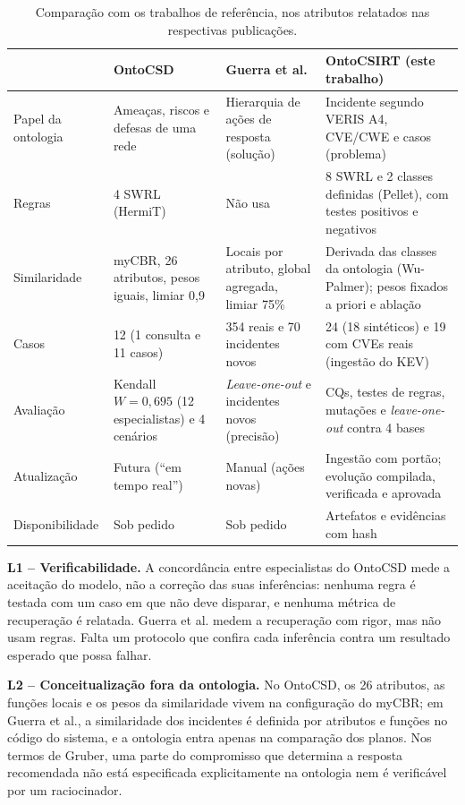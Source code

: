 \documentclass[12pt]{article}
\begin{document}
\begin{table}[ht]
\centering\scriptsize
\caption{Comparação com os trabalhos de referência, nos atributos relatados nas respectivas publicações.}
\label{tab:sota}
\begin{tabularx}{\textwidth}{@{}p{1.9cm}XXX@{}}
\toprule
 & OntoCSD \cite{wu2024ontocsd} & Guerra et al. \cite{guerra2025cases} & OntoCSIRT (este trabalho)\\
\midrule
Papel da ontologia & Ameaças, riscos e defesas de uma rede & Hierarquia de ações de resposta (solução) & Incidente segundo VERIS A4, CVE/CWE e casos (problema)\\
Regras & 4 SWRL (HermiT) & Não usa & 8 SWRL e 2 classes definidas (Pellet), com testes positivos e negativos\\
Similaridade & myCBR, 26 atributos, pesos iguais, limiar 0,9 & Locais por atributo, global agregada, limiar 75\% & Derivada das classes da ontologia (Wu-Palmer); pesos fixados a priori e ablação\\
Casos & 12 (1 consulta e 11 casos) & 354 reais e 70 incidentes novos & 24 (18 sintéticos) e 19 com CVEs reais (ingestão do KEV)\\
Avaliação & Kendall $W=0{,}695$ (12 especialistas) e 4 cenários & \emph{Leave-one-out} e incidentes novos (precisão) & CQs, testes de regras, mutações e \emph{leave-one-out} contra 4 bases\\
Atualização & Futura (``em tempo real'') & Manual (ações novas) & Ingestão com portão; evolução compilada, verificada e aprovada\\
Disponibilidade & Sob pedido & Sob pedido & Artefatos e evidências com hash\\
\bottomrule
\end{tabularx}
\end{table}

\textbf{L1 -- Verificabilidade.} A concordância entre especialistas do OntoCSD mede a aceitação do modelo, não a correção das suas inferências: nenhuma regra é testada com um caso em que não deve disparar, e nenhuma métrica de recuperação é relatada. Guerra et al. medem a recuperação com rigor, mas não usam regras. Falta um protocolo que confira cada inferência contra um resultado esperado que possa falhar.

\textbf{L2 -- Conceitualização fora da ontologia.} No OntoCSD, os 26 atributos, as funções locais e os pesos da similaridade vivem na configuração do myCBR; em Guerra et al., a similaridade dos incidentes é definida por atributos e funções no código do sistema, e a ontologia entra apenas na comparação dos planos. Nos termos de Gruber, uma parte do compromisso que determina a resposta recomendada não está especificada explicitamente na ontologia nem é verificável por um raciocinador.
\end{document}
